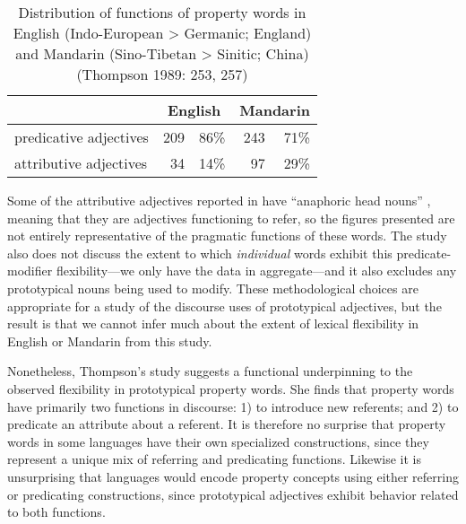 \begin{table}[h]
  \centering
  \caption[Distribution of functions of property words in English (Indo-European > Germanic; England) and Mandarin (Sino-Tibetan > Sinitic; China)]{Distribution of functions of property words in English (Indo-European > Germanic; England) and Mandarin (Sino-Tibetan > Sinitic; China) (Thompson 1989: 253, 257)}
  \label{tab:Thompson-1989}
  \begin{tabular}{ l r r r r }
    \toprule
                             & \multicolumn{2}{c}{English} & \multicolumn{2}{c}{Mandarin} \\
    \midrule
      predicative adjectives & 209 & 86\%                  & 243 & 71\% \\
      attributive adjectives &  34 & 14\%                  &  97 & 29\% \\
    \bottomrule
  \end{tabular}
\end{table}

\noindent Some of the attributive adjectives reported in  have \enquote{anaphoric head nouns} , meaning that they are adjectives functioning to refer, so the figures presented are not entirely representative of the pragmatic functions of these words. The study also does not discuss the extent to which \emph{individual} words exhibit this predicate-modifier flexibility—we only have the data in aggregate—and it also excludes any prototypical nouns being used to modify. These methodological choices are appropriate for a study of the discourse uses of prototypical adjectives, but the result is that we cannot infer much about the extent of lexical flexibility in English or Mandarin from this study.

Nonetheless, Thompson's study suggests a functional underpinning to the observed flexibility in prototypical property words. She finds that property words have primarily two functions in discourse: 1) to introduce new referents; and 2) to predicate an attribute about a referent. It is therefore no surprise that property words in some languages have their own specialized constructions, since they represent a unique mix of referring and predicating functions. Likewise it is unsurprising that languages would encode property concepts using either referring or predicating constructions, since prototypical adjectives exhibit behavior related to both functions.

